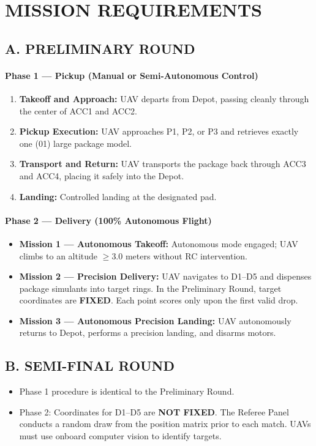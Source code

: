 \documentclass[12pt,a4paper]{article}
\begin{document}
\section{MISSION REQUIREMENTS}

\subsection*{A. PRELIMINARY ROUND}
\paragraph{Phase 1 — Pickup (Manual or Semi-Autonomous Control)}
\begin{enumerate}
\item \textbf{Takeoff and Approach:} UAV departs from Depot, passing cleanly through the center of ACC1 and ACC2.
\item \textbf{Pickup Execution:} UAV approaches P1, P2, or P3 and retrieves exactly one (01) large package model.
\item \textbf{Transport and Return:} UAV transports the package back through ACC3 and ACC4, placing it safely into the Depot.
\item \textbf{Landing:} Controlled landing at the designated pad.
\end{enumerate}

\paragraph{Phase 2 — Delivery (100\% Autonomous Flight)}
\begin{itemize}
\item \textbf{Mission 1 — Autonomous Takeoff:} Autonomous mode engaged; UAV climbs to an altitude $\geq 3.0$ meters without RC intervention.
\item \textbf{Mission 2 — Precision Delivery:} UAV navigates to D1–D5 and dispenses package simulants into target rings. In the Preliminary Round, target coordinates are \textbf{FIXED}. Each point scores only upon the first valid drop.
\item \textbf{Mission 3 — Autonomous Precision Landing:} UAV autonomously returns to Depot, performs a precision landing, and disarms motors.
\end{itemize}

\subsection*{B. SEMI-FINAL ROUND}
\begin{itemize}
\item Phase 1 procedure is identical to the Preliminary Round.
\item Phase 2: Coordinates for D1–D5 are \textbf{NOT FIXED}. The Referee Panel conducts a random draw from the position matrix prior to each match. UAVs must use onboard computer vision to identify targets.
\end{itemize}
\end{document}
